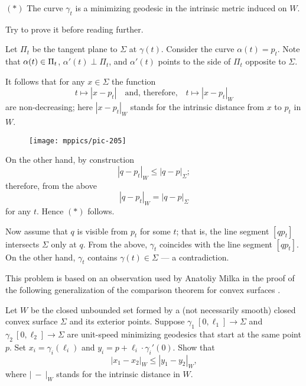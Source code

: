 \begin{cl}{$({*})$} The curve $\gamma_t$ is a minimizing geodesic in the intrinsic metric induced on $W$.
\end{cl}


Try to prove it before reading further.

\medskip

Let $\Pi_t$ be the tangent plane to $\Sigma$ at $\gamma(t)$.
Consider the curve $\alpha(t)=p_t$.
Note that  
$\alpha(t)\z\in\Pi_t$,
$\alpha'(t)\perp\Pi_t$,
and $\alpha'(t)$ points to the side of $\Pi_t$ opposite to $\Sigma$.



It follows that for any $x\in\Sigma$ the function  
\[t\mapsto |x - p_t|
\quad\text{and, therefore,}\quad
t\mapsto |x - p_t|_W\] are non-decreasing;
here $|x - p_t|_W$ stands for the intrinsic distance from $x$ to $p_t$ in $W$.


\begin{wrapfigure}{r}{43 mm}
\vskip-6mm
\centering
\texttt{[image: mppics/pic-205]}
\end{wrapfigure}

On the other hand, by construction 
\[|q - p_t|_W\le |q - p|_\Sigma;\] 
therefore, from the above 
\[|q - p_t|_W= |q - p|_\Sigma\]
for any $t$.
Hence $(*)$ follows.

Now assume that $q$ is visible from $p_t$ for some $t$;
that is, the line segment $[qp_t]$ intersects $\Sigma$ only at $q$.
From the above, 
$\gamma_t$  coincides with the line segment $[qp_t]$.
On the other hand, $\gamma_t$ contains $\gamma(t)\in\Sigma$ --- a contradiction.\qeds

This problem is based on an observation used by Anatoliy Milka in the proof of the following generalization of the comparison theorem for convex surfaces \cite[Theorem 2]{milka-geod}.

\begin{pr}
Let $W$ be the closed unbounded set formed by a (not necessarily smooth) closed convex surface $\Sigma$ and its exterior points.
Suppose $\gamma_1\:[0,\ell_1]\to \Sigma$ and $\gamma_2\:[0,\ell_2]\to \Sigma$ are unit-speed minimizing geodesics that start at the same point $p$.
Set $x_i=\gamma_i(\ell_i)$ and $y_i=p+\ell_i\cdot\gamma_i'(0)$.
Show that 
\[|x_1-x_2|_W\le |y_1-y_2|_W,\]
where $|\  - \ |_W$ stands for the intrinsic distance in $W$.
\end{pr}



